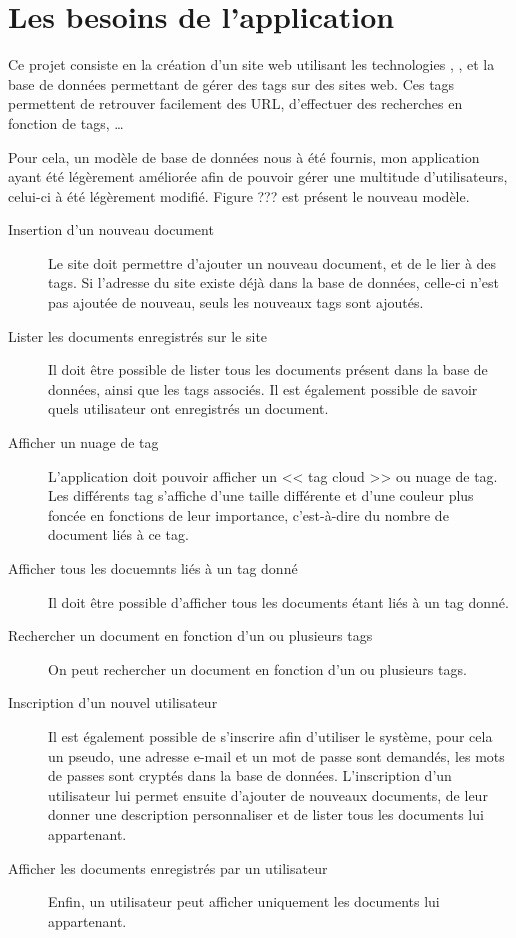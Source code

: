 \documentclass[12pt,a4paper,openany]{book}
\begin{document}
	\chapter{Les besoins de l'application}
	Ce projet consiste en la création d'un site web utilisant les technologies , ,  et la base de données 
	permettant de gérer des tags sur des sites web. Ces tags permettent de retrouver facilement des URL, d'effectuer des recherches
	en fonction de tags, \ldots

	Pour cela, un modèle de base de données nous à été fournis, mon application ayant été légèrement améliorée afin de pouvoir gérer
	une multitude d'utilisateurs, celui-ci à été légèrement modifié. Figure ??? est présent le nouveau modèle. %

	\begin{description}
		\item[Insertion d'un nouveau document] 
	Le site doit permettre d'ajouter un nouveau document, et de le lier à des tags. Si l'adresse du site existe déjà dans la base de
	données, celle-ci n'est pas ajoutée de nouveau, seuls les nouveaux tags sont ajoutés.
		\item[Lister les documents enregistrés sur le site] 
	Il doit être possible de lister tous les documents présent dans la base de données, ainsi que les tags associés. Il est également
	possible de savoir quels utilisateur ont enregistrés un document.
		\item[Afficher un nuage de tag] 
	L'application doit pouvoir afficher un << tag cloud >> ou nuage de tag. Les différents tag s'affiche d'une taille différente et
	d'une couleur plus foncée en fonctions de leur importance, c'est-à-dire du nombre de document liés à ce tag. 
		\item[Afficher tous les docuemnts liés à un tag donné] 
	Il doit être possible d'afficher tous les documents étant liés à un tag donné.
		\item[Rechercher un document en fonction d'un ou plusieurs tags] 
	On peut rechercher un document en fonction d'un ou plusieurs tags.
	\item[Inscription d'un nouvel utilisateur] 
	Il est également possible de s'inscrire afin d'utiliser le système, pour cela un pseudo, une adresse e-mail et un mot de passe sont
	demandés, les mots de passes sont cryptés dans la base de données. L'inscription d'un utilisateur lui permet ensuite d'ajouter
	de nouveaux documents, de leur donner une description personnaliser et de lister tous les documents lui appartenant.
	\item[Afficher les documents enregistrés par un utilisateur] 
	Enfin, un utilisateur peut afficher uniquement les doc\-uments lui appartenant.
	\end{description}
\end{document}
